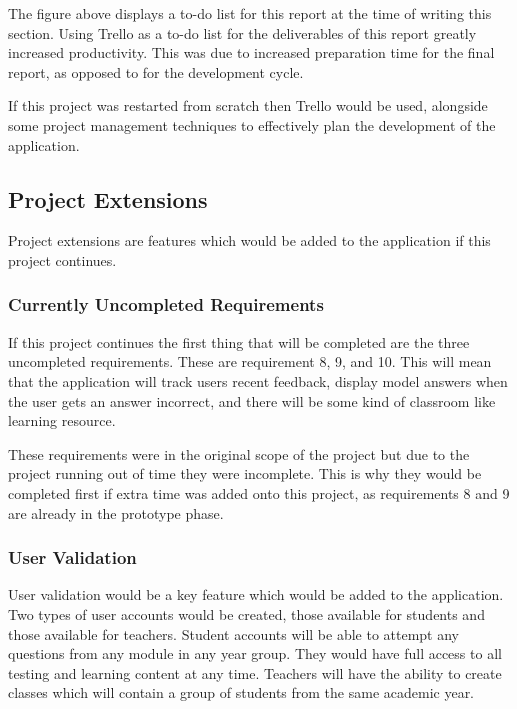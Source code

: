 \documentclass{article}
\begin{document}
The figure above displays a to-do list for this report at the time of writing this section. Using Trello as a to-do list for the deliverables of this report greatly increased productivity. This was due to increased preparation time for the final report, as opposed to for the development cycle. \par

If this project was restarted from scratch then Trello would be used, alongside some project management techniques to effectively plan the development of the application. \par

\subsection{Project Extensions}

Project extensions are features which would be added to the application if this project continues. 

\subsubsection{Currently Uncompleted Requirements}

If this project continues the first thing that will be completed are the three uncompleted requirements. These are requirement 8, 9, and 10. This will mean that the application will track users recent feedback, display model answers when the user gets an answer incorrect, and there will be some kind of classroom like learning resource. \par

These requirements were in the original scope of the project but due to the project running out of time they were incomplete. This is why they would be completed first if extra time was added onto this project, as requirements 8 and 9 are already in the prototype phase. 

\subsubsection{User Validation}

User validation would be a key feature which would be added to the application. Two types of user accounts would be created, those available for students and those available for teachers. Student accounts will be able to attempt any questions from any module in any year group. They would have full access to all testing and learning content at any time. Teachers will have the ability to create classes which will contain a group of students from the same academic year. \par
\end{document}
